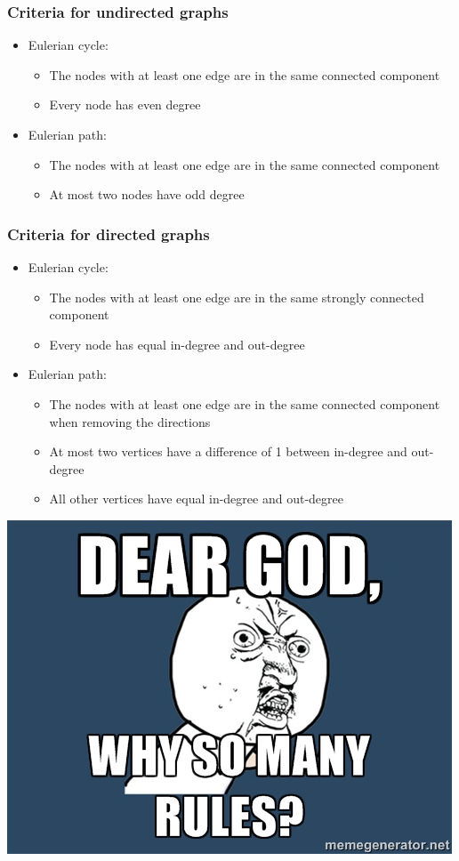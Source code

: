 \documentclass[12pt]{beamer}
\begin{document}
\begin{frame}
\frametitle{Criteria for undirected graphs}
\begin{itemize}
\item Eulerian cycle:
    \begin{itemize}
    \item The nodes with at least one edge are in the same connected component
    \item Every node has even degree
    \end{itemize}
\item Eulerian path:
    \begin{itemize}
    \item The nodes with at least one edge are in the same connected component
    \item At most two nodes have odd degree
    \end{itemize}
\end{itemize}
\end{frame}

\begin{frame}
\frametitle{Criteria for directed graphs}
\begin{itemize}
\item Eulerian cycle:
    \begin{itemize}
    \item The nodes with at least one edge are in the same strongly connected component
    \item Every node has equal in-degree and out-degree
    \end{itemize}
\item Eulerian path:
    \begin{itemize}
    \item The nodes with at least one edge are in the same connected component when removing the directions
    \item At most two vertices have a difference of 1 between in-degree and out-degree
    \item All other vertices have equal in-degree and out-degree
    \end{itemize}
\end{itemize}
\begin{center}
\includegraphics[width=.35\linewidth]{img/why-so-many}
\end{center}
\end{frame}
\end{document}
